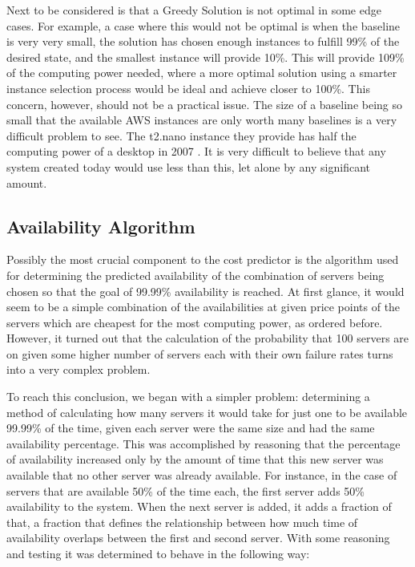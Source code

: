 \documentclass[thesis,proposal]{umassthesis}  %
\begin{document}
Next to be considered is that a Greedy Solution is not optimal in some edge cases. For example, a case where this would not be optimal is when the baseline is very very small, the solution has chosen enough instances to fulfill 99\% of the desired state, and the smallest instance will provide 10\%. This will provide 109\% of the computing power needed, where a more optimal solution using a smarter instance selection process would be ideal and achieve closer to 100\%. This concern, however, should not be a practical issue. The size of a baseline being so small that the available AWS instances are only worth many baselines is a very difficult problem to see. The t2.nano instance they provide has half the computing power of a desktop in 2007 \cite{avgInstalledMem}. It is very difficult to believe that any system created today would use less than this, let alone by any significant amount.\par


\subsection{Availability Algorithm}

Possibly the most crucial component to the cost predictor is the algorithm used for determining the  predicted availability of the combination of servers being chosen so that the goal of 99.99\% availability is reached. At first glance, it would seem to be a simple combination of the availabilities at given price points of the servers which are cheapest for the most computing power, as ordered before. However, it turned out that the calculation of the probability that 100 servers are on given some higher number of servers each with their own failure rates turns into a very complex problem.\par

To reach this conclusion, we began with a simpler problem: determining a method of calculating how many servers it would take for just one to be available 99.99\% of the time, given each server were the same size and had the same availability percentage. This was accomplished by reasoning that the percentage of availability increased only by the amount of time that this new server was available that no other server was already available. For instance, in the case of servers that are available 50\% of the time each, the first server adds 50\% availability to the system. When the next server is added, it adds a fraction of that, a fraction that defines the relationship between how much time of availability overlaps between the first and second server. With some reasoning and testing it was determined to behave in the following way:
\end{document}
